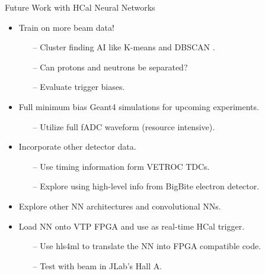 \documentclass[10pt]{beamer}
\begin{document}
\begin{frame}{Future Work with HCal Neural Networks}

	\begin{itemize}
		\item {}\alert{Train on more beam data!}
			\begin{itemize}
				\item[--] Cluster finding AI like K-means and DBSCAN \parencite{Article:osti_1786294}.
				\item[--] Can protons and neutrons be separated?
				\item[--] Evaluate trigger biases.
			\end{itemize}
		\item {}\alert{Full minimum bias Geant4 simulations for upcoming experiments}.
		\begin{itemize}
			\item[--] Utilize full fADC waveform (\alert{resource intensive}).
		\end{itemize}
		\item {}\alert{Incorporate other detector data.}
		\begin{itemize}
			\item[--] Use timing information form VETROC TDCs.
			\item[--] Explore using high-level info from BigBite electron detector. %
		\end{itemize}
		\item {}\alert{Explore other NN architectures and convolutional NNs.}
		\item {}\alert{Load NN onto VTP FPGA and use as real-time HCal trigger.}
		\begin{itemize}
			\item[--] Use hls4ml to translate the NN into FPGA compatible code.
			\item[--] Test with beam in JLab's Hall A.
		\end{itemize}
	\end{itemize}

\end{frame}
\end{document}
